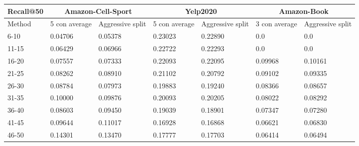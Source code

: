 \begin{table*}[h!]
    \centering
    \begin{tabular}{|l|l|l||l|l||l|l|}
        \hline
        Recall@50 & \multicolumn{2}{c||}{Amazon-Cell-Sport} & \multicolumn{2}{c||}{Yelp2020} & \multicolumn{2}{c|}{Amazon-Book}                                                       \\ \hline
        Method    & 5 con average                           & Aggressive split               & 5 con average                    & Aggressive split & 3 con average & Aggressive split \\ \hline
        6-10      & 0.04706                                 & 0.05378                        & 0.23023                          & 0.22890          & 0.0           & 0.0              \\ \hline
        11-15     & 0.06429                                 & 0.06966                        & 0.22722                          & 0.22293          & 0.0           & 0.0              \\ \hline
        16-20     & 0.07557                                 & 0.07333                        & 0.22093                          & 0.22095          & 0.09968       & 0.10161          \\ \hline
        21-25     & 0.08262                                 & 0.08910                        & 0.21102                          & 0.20792          & 0.09102       & 0.09335          \\ \hline
        26-30     & 0.08784                                 & 0.07973                        & 0.19883                          & 0.19240          & 0.08366       & 0.08657          \\ \hline
        31-35     & 0.10000                                 & 0.09876                        & 0.20093                          & 0.20205          & 0.08022       & 0.08292          \\ \hline
        36-40     & 0.08603                                 & 0.09450                        & 0.19039                          & 0.18901          & 0.07347       & 0.07280          \\ \hline
        41-45     & 0.09644                                 & 0.11017                        & 0.16928                          & 0.16868          & 0.06621       & 0.06830          \\ \hline
        46-50     & 0.14301                                 & 0.13470                        & 0.17777                          & 0.17703          & 0.06414       & 0.06494          \\ \hline

\end{tabular}
\end{table*}
